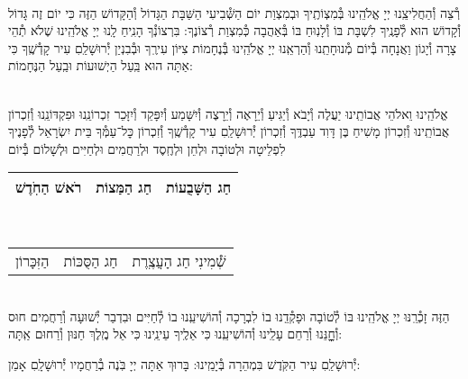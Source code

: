 \documentclass[twoside, openany, parskip=half, 11pt]{book}
\begin{document}
\vspace{-.25\baselineskip}
\begin{sometimes}

\shabbos\\
רְ֯צֵה וְ֯הַחֲלִיצֵֽנוּ יְיָ אֱלֹהֵֽינוּ בְּ֯מִצְוֹתֶֽיךָ וּבְמִצְוַת יוֹם הַשְּׁ֯בִיעִי הַשַּׁבָּת הַגָּדוֹל וְ֯הַקָּדוֹשׁ הַזֶּה כִּי יוֹם זֶה גָּדוֹל וְ֯קָדוֹשׁ הוּא לְ֯פָנֶֽיךָ לִשְׁבָּת בּוֹ וְ֯לָנֽוּחַ בּוֹ בְּ֯אַהֲבָה כְּ֯מִצְוַת רְ֯צוֹנֶךָ: בִּרְצוֹנְ֯ךָ הָנִֽיחַ לָֽנוּ יְיָ אֱלֹהֵֽינוּ שֶׁלֹא תְ֯הֵי צָרָה וְ֯יָגוֹן וַאֲנָחָה בְּ֯יוֹם מְ֯נוּחָתֵֽנוּ וְ֯הַרְאֵֽנוּ יְיָ אֱלֹהֵֽינוּ בְּ֯נֶחָמוֹת צִיּוֹן עִירֶֽךָ וּבְ֯בִנְיַן יְ֯רוּשָׁלַֽםִ עִיר קָדְ֯שֶֽׁךָ כִּי אַתָּה הוּא בַּֽעַל הַיְשׁוּעוֹת וּבַֽעַל הַנֶּחָמוֹת:


\sepline %

\vspace{-.25\baselineskip}
\\
אֱלֹהֵֽינוּ וֵאלֹהֵי אֲבוֹתֵֽינוּ יַעֲלֶה וְ֯יָבֹא וְ֯יַגִּיעַ וְ֯יֵרָאֶה וְ֯יֵרָצֶה וְ֯יִשָּׁמַע וְ֯יִפָּקֵד וְ֯יִזָּכֵר זִכְרוֹנֵֽנוּ וּפִקְדּוֹנֵֽנוּ וְ֯זִכְרוֹן אֲבוֹתֵֽינוּ וְ֯זִכְרוֹן מָשִׁיחַ בֶּן דָּוִד עַבְדֶּֽךָ וְ֯זִכְרוֹן יְ֯רוּשָׁלַֽםִ עִיר קָדְ֯שֶֽׁךָ וְ֯זִכְרוֹן כׇּל־עַמְּ֯ךָ בֵּית יִשְׂרָאֵל לְ֯פָנֶיךָ לִפְלֵיטָה וּלְטוֹבָה וּלְחֵן וּלְחֶֽסֶד וּלְרַחֲמִים וּלְחַיִּים וּלְשָׁלוֹם בְּ֯יוֹם\\
\begin{tabular}{c|c|c}
רֹאשׁ הַחֹֽדֶשׁ & חַג הַמַּצוֹת & חַג הַשָּׁבֻעוֹת\\ \hline
\end{tabular}\\
\begin{tabular}{c|c|c}
הַזִּכָּרוֹן & חַג הַסֻּכּוֹת & שְׁ֯מִינִי חַג הָעֲצֶֽרֶת
\end{tabular}\\
הַזֶּה זָכְ֯רֵֽנּוּ יְיָ אֱלֹהֵֽינוּ בּוֹ לְ֯טוֹבָה וּפָקְ֯דֵֽנוּ בוֹ לִבְרָכָה וְ֯הוֹשִׁיעֵֽנוּ בוֹ לְ֯חַיִּים וּבִדְבַר יְ֯שׁוּעָה וְ֯רַחֲמִים חוּס וְ֯חׇׇׇׇׇׇנֵּנוּ וְ֯רַחֵם עָלֵֽינוּ וְ֯הוֹשִׁיעֵֽנוּ כִּי אֵלֶֽיךָ עֵינֵֽינוּ כִּי אֵל מֶֽלֶךְ חַנּוּן וְ֯רַחוּם אַֽתָּה:

\end{sometimes}

יְ֯רוּשָׁלַֽםִ עִיר הַקֹּֽדֶשׁ בִּמְהֵרָה בְּ֯יָמֵֽינוּ: בָּרוּךְ אַתָּה יְיָ בֹּֽנֶה בְ֯רַחֲמָיו יְ֯רוּשָׁלָֽםִ אָמֵן:
\end{document}
